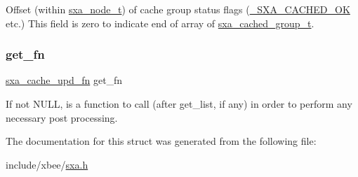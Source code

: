 Offset (within \hyperlink{structsxa__node__t}{sxa\+\_\+node\+\_\+t}) of cache group status flags (\hyperlink{group___s_x_a_gga0411cd49bb5b71852cecd93bcbf0ca2da54498f64b3ad7c2be423d32b45deac04}{\+\_\+\+S\+X\+A\+\_\+\+C\+A\+C\+H\+E\+D\+\_\+\+OK} etc.) This field is zero to indicate end of array of \hyperlink{structsxa__cached__group__t}{sxa\+\_\+cached\+\_\+group\+\_\+t}. 

\mbox{\label{structsxa__cached__group__t_aa73aae7aa31e051678e55ca4025a2d3a}} 
\subsubsection{\texorpdfstring{get\+\_\+fn}{get\_fn}}
{\footnotesize\ttfamily \hyperlink{group___s_x_a_gaaeb2977fc8c351b3edcf007c1effc374}{sxa\+\_\+cache\+\_\+upd\+\_\+fn} get\+\_\+fn}



If not N\+U\+LL, is a function to call (after get\+\_\+list, if any) in order to perform any necessary post processing. 



The documentation for this struct was generated from the following file\+:\begin{DoxyCompactItemize}
\item 
include/xbee/\hyperlink{sxa_8h}{sxa.\+h}\end{DoxyCompactItemize}
